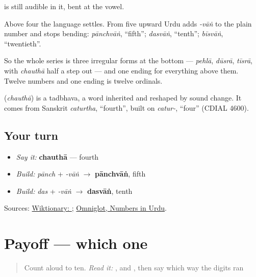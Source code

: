 \textbf{} is still audible in it, bent at the vowel.

Above four the language settles. From five upward Urdu adds \emph{-vāṅ} to the plain number and stops bending: \emph{pānchvāṅ}, \textquotedblleft{}fifth\textquotedblright{}; \emph{dasvāṅ}, \textquotedblleft{}tenth\textquotedblright{}; \emph{bīsvāṅ}, \textquotedblleft{}twentieth\textquotedblright{}.

So the whole series is three irregular forms at the bottom — \emph{pehlā}, \emph{dūsrā}, \emph{tīsrā}, with \emph{chauthā} half a step out — and one ending for everything above them. Twelve numbers and one ending is twelve ordinals.

\begin{cousinweb}
\textbf{} (\emph{chauthā}) is a tadbhava, a word inherited and reshaped by sound change. It comes from Sanskrit \emph{caturtha}, \textquotedblleft{}fourth\textquotedblright{}, built on \emph{catur-}, \textquotedblleft{}four\textquotedblright{} (CDIAL 4600).
\end{cousinweb}

\subsection*{Your turn}
\begin{itemize}
\raggedright
  \item \emph{Say it:} \textbf{chauthā} — fourth
  \item \emph{Build:} \emph{pānch} + \emph{-vāṅ} $\to$ \textbf{pānchvāṅ}, fifth
  \item \emph{Build:} \emph{das} + \emph{-vāṅ} $\to$ \textbf{dasvāṅ}, tenth
\end{itemize}

\begin{tcolorbox}[breakable,colback=teal!4,colframe=teal!35!black,title={Before you move on}]
Sources: \href{https://en.wiktionary.org/wiki/\%DA\%86\%D9\%88\%D8\%AA\%DA\%BE\%D8\%A7}{Wiktionary: }; \href{https://www.omniglot.com/language/numbers/urdu.htm}{Omniglot, Numbers in Urdu}.
\end{tcolorbox}
\section[Practice]{Payoff — which one}

\label{lesson:UR-C32-practice}



\begin{quote}
Count aloud to ten. \emph{Read it:} \textbf{}, \textbf{} and \textbf{}, then say which way the digits ran
\end{quote}

